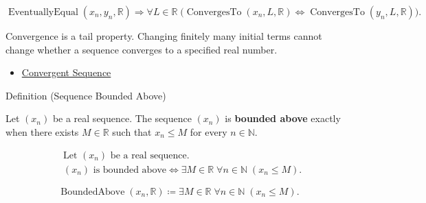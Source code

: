 \begin{remark*}
\[
\operatorname{EventuallyEqual}(x_n,y_n,\mathbb{R})
\Longrightarrow
\forall L \in \mathbb{R}\;
\bigl(
\operatorname{ConvergesTo}(x_n,L,\mathbb{R})
\Longleftrightarrow
\operatorname{ConvergesTo}(y_n,L,\mathbb{R})
\bigr).
\]
\end{remark*}

\begin{remark*}[Interpretation]
Convergence is a tail property. Changing finitely many initial terms cannot
change whether a sequence converges to a specified real number.
\end{remark*}

\begin{dependencies}
\begin{itemize}
  \item \hyperref[def:convergent-sequence]{Convergent Sequence}
\end{itemize}
\end{dependencies}


\begin{definitionbox}{Definition (Sequence Bounded Above)}
\begin{definition}
\label{def:sequence-bounded-above}
Let $(x_n)$ be a real sequence. The sequence $(x_n)$ is
\textbf{bounded above} exactly when there exists $M \in \mathbb{R}$ such
that $x_n \le M$ for every $n \in \mathbb{N}$.
\end{definition}
\end{definitionbox}

\begin{remark*}
\[
\begin{aligned}
&\text{Let } (x_n) \text{ be a real sequence.}\\
&(x_n) \text{ is bounded above}
\Longleftrightarrow
\exists M \in \mathbb{R}\;
\forall n \in \mathbb{N}\;(x_n \le M).
\end{aligned}
\]
\end{remark*}

\begin{remark*}
\[
\operatorname{BoundedAbove}(x_n,\mathbb{R})
\coloneqq
\exists M \in \mathbb{R}\;
\forall n \in \mathbb{N}\;(x_n \le M).
\]
\end{remark*}

